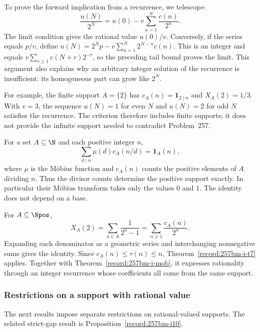 To prove the forward implication from a recurrence, we telescope:
\[
 \frac{u(N)}{2^N}=u(0)-v\sum_{n=1}^N\frac{c(n)}{2^n}.
\]
The limit condition gives the rational value $u(0)/v$.  Conversely, if the
series equals $p/v$, define
$u(N)=2^Np-v\sum_{n=1}^N2^{N-n}c(n)$.  This is an integer and equals
$v\sum_{r\ge1}c(N+r)2^{-r}$, so the preceding tail bound proves the limit.
This argument also explains why an arbitrary integer solution of the
recurrence is insufficient: its homogeneous part can grow like $2^N$.

For example, the finite support $A=\{2\}$ has
$c_A(n)=\mathbf1_{2\mid n}$ and $X_A(2)=1/3$.  With $v=3$, the sequence
$u(N)=1$ for even $N$ and $u(N)=2$ for odd $N$ satisfies the recurrence.
The criterion therefore includes finite supports; it does not provide the
infinite support needed to contradict Problem~257.

\begin{thm}\label{record:257bm-i-mob}
For a set $A\subseteq\N$ and each positive integer $n$,
\[
 \sum_{d\mid n}\mu(d)c_A(n/d)=\mathbf1_A(n),
\]
where $\mu$ is the M\"obius function and $c_A(n)$ counts the positive
elements of $A$ dividing $n$.  Thus the divisor counts determine the
positive support exactly.  In particular their M\"obius transform takes
only the values $0$ and $1$.  The identity does not depend on a base.
\end{thm}

\begin{thm}\label{record:257bm-i-bridge}
For $A\subseteq\Npos$,
\[
 X_A(2)=\sum_{a\in A}\frac1{2^a-1}
       =\sum_{n\ge1}\frac{c_A(n)}{2^n}.
\]
Expanding each denominator as a geometric series and interchanging
nonnegative sums gives the identity.  Since $c_A(n)\le\tau(n)\le n$,
Theorem~\ref{record:257bm-i-t7} applies.  Together with
Theorem~\ref{record:257bm-i-mob}, it expresses rationality through an
integer recurrence whose coefficients all come from the same support.
\end{thm}

\subsubsection*{Restrictions on a support with rational value}

The next results impose separate restrictions on rational-valued supports.
The related strict-gap result is Proposition~\ref{record:257bm-i10}.

